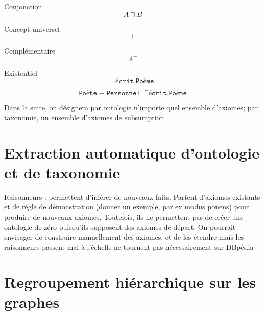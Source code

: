 Conjonction
\begin{equation}
    A \sqcap B
\end{equation}

Concept universel
\begin{equation}
    \top
\end{equation}

Complémentaire
\begin{equation}
    A^-
\end{equation}

Existentiel
\begin{equation}
    \exists \texttt{écrit}.\texttt{Poème}
\end{equation}

\begin{equation}
    \texttt{Poète} \equiv \texttt{Personne} \sqcap \exists \texttt{écrit}.\texttt{Poème}
\end{equation}



Dans la suite, on désignera par ontologie n'importe quel ensemble d'axiomes; par taxonomie, un ensemble d'axiomes de subsumption



\section{Extraction automatique d'ontologie et de taxonomie}


Raisonneurs : permettent d'inférer de nouveaux faits. Partent d'axiomes existants et de règle de démonstration (donner un exemple, par ex modus ponens) pour produire de nouveaux axiomes. Toutefois, ils ne permettent pas de créer une ontologie de zéro puisqu'ils supposent des axiomes de départ. On pourrait envisager de construire manuellement des axiomes, et de les étendre mais les raisonneurs passent mal à l'échelle ne tournent pas nécessairement sur DBpédia






\section{Regroupement hiérarchique sur les graphes}

